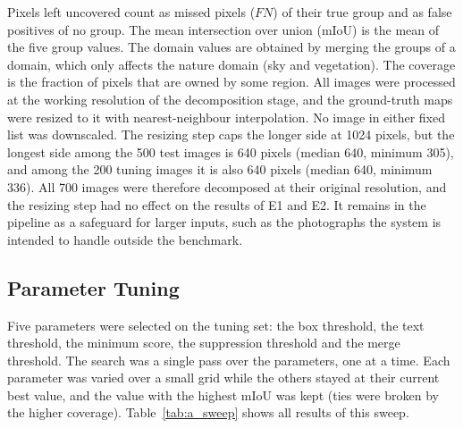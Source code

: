 \documentclass{FastFyp}
\begin{document}
Pixels left uncovered count as missed pixels ($FN$) of their true group and as false positives of no group. The mean intersection over union (mIoU) is the mean of the five group values. The domain values are obtained by merging the groups of a domain, which only affects the nature domain (sky and vegetation). The coverage is the fraction of pixels that are owned by some region. All images were processed at the working resolution of the decomposition stage, and the ground-truth maps were resized to it with nearest-neighbour interpolation. No image in either fixed list was downscaled. The resizing step caps the longer side at 1024 pixels, but the longest side among the 500 test images is 640 pixels (median 640, minimum 305), and among the 200 tuning images it is also 640 pixels (median 640, minimum 336). All 700 images were therefore decomposed at their original resolution, and the resizing step had no effect on the results of E1 and E2. It remains in the pipeline as a safeguard for larger inputs, such as the photographs the system is intended to handle outside the benchmark.
 
\subsection{Parameter Tuning}
\label{subsec:e1-parameter-tuning}
Five parameters were selected on the tuning set: the box threshold, the text threshold, the minimum score, the suppression threshold and the merge threshold. The search was a single pass over the parameters, one at a time. Each parameter was varied over a small grid while the others stayed at their current best value, and the value with the highest mIoU was kept (ties were broken by the higher coverage). Table~\ref{tab:a_sweep} shows all results of this sweep.
 
\end{document}
